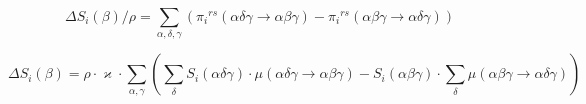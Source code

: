 \documentclass[a4paper]{article}
\newcommand\rs{{}^{rs}}
\begin{document}
\begin{equation}
\Delta S_i(\beta) / \rho = \sum_{\alpha,\delta,\gamma}\left(\pi_i\rs(\alpha\delta\gamma \to \alpha\beta\gamma) - \pi_i\rs(\alpha\beta\gamma \to \alpha\delta\gamma)\right)
\end{equation}



\begin{equation}
\boxed{
\Delta S_i(\beta)  = \rho\cdot\varkappa\cdot\sum_{\alpha,\gamma}\left(\sum_{\delta}S_i(\alpha\delta\gamma)\cdot\mu(\alpha\delta\gamma \to \alpha\beta\gamma) - S_i(\alpha\beta\gamma)\cdot\sum_{\delta}\mu(\alpha\beta\gamma \to \alpha\delta\gamma)\right)
}
\end{equation}
\end{document}
